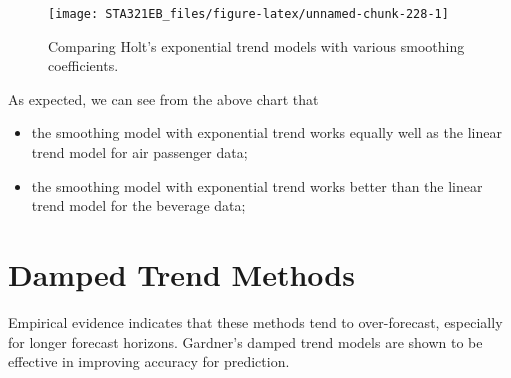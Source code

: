 \documentclass[
]{book}
\newenvironment{Shaded}{\begin{snugshade}}{\end{snugshade}}
\newcommand{\AttributeTok}[1]{\textcolor[rgb]{0.13,0.29,0.53}{#1}}
\newcommand{\DecValTok}[1]{\textcolor[rgb]{0.00,0.00,0.81}{#1}}
\newcommand{\DocumentationTok}[1]{\textcolor[rgb]{0.56,0.35,0.01}{\textbf{\textit{#1}}}}
\newcommand{\FunctionTok}[1]{\textcolor[rgb]{0.13,0.29,0.53}{\textbf{#1}}}
\newcommand{\NormalTok}[1]{#1}
\newcommand{\SpecialCharTok}[1]{\textcolor[rgb]{0.81,0.36,0.00}{\textbf{#1}}}
\newcommand{\StringTok}[1]{\textcolor[rgb]{0.31,0.60,0.02}{#1}}
\begin{document}
\begin{Shaded}
\end{Shaded}

\begin{figure}

{\centering \texttt{[image: STA321EB\_files/figure-latex/unnamed-chunk-228-1]} 

}

\caption{ Comparing Holt's exponential trend models with various smoothing coefficients.}\label{fig:unnamed-chunk-228}
\end{figure}

As expected, we can see from the above chart that

\begin{itemize}
\item
  the smoothing model with exponential trend works equally well as the linear trend model for air passenger data;
\item
  the smoothing model with exponential trend works better than the linear trend model for the beverage data;
\end{itemize}

\hypertarget{damped-trend-methods}{%
\section{Damped Trend Methods}\label{damped-trend-methods}}

Empirical evidence indicates that these methods tend to over-forecast, especially for longer forecast horizons. Gardner's damped trend models are shown to be effective in improving accuracy for prediction.
\end{document}
